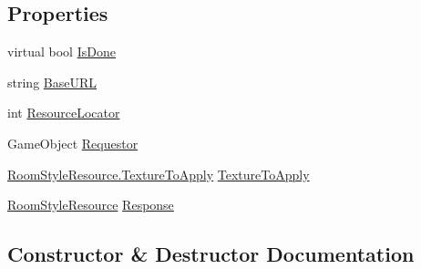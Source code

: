 \subsection*{Properties}
\begin{DoxyCompactItemize}
\item 
virtual bool \mbox{\hyperlink{class_base_room_style_request_a26ebb6b3a4b26d749687ad56f6b7c8aa}{Is\+Done}}
\item 
string \mbox{\hyperlink{class_base_room_style_request_a1bd3ac311ae8be564cf06fc42320d575}{Base\+U\+RL}}
\item 
int \mbox{\hyperlink{class_base_room_style_request_a5787f94bce07b0c2d1e8833030d74fcf}{Resource\+Locator}}
\item 
Game\+Object \mbox{\hyperlink{class_base_room_style_request_abac03d12004ad78ee9ddd7fddf3dffdb}{Requestor}}
\item 
\mbox{\hyperlink{class_room_style_resource_a877062d3830671f8376cc30340cdb45f}{Room\+Style\+Resource.\+Texture\+To\+Apply}} \mbox{\hyperlink{class_base_room_style_request_a0c2996f1b625ee3556bec48ce3370273}{Texture\+To\+Apply}}
\item 
\mbox{\hyperlink{class_room_style_resource}{Room\+Style\+Resource}} \mbox{\hyperlink{class_base_room_style_request_a1a30d5a6a7da9fe5b221d4fe6b3f69de}{Response}}
\end{DoxyCompactItemize}


\subsection{Constructor \& Destructor Documentation}
\mbox{\label{class_base_room_style_request_a7ac7b7ae86b8b63b1be428ad0cf8c6eb}} 
